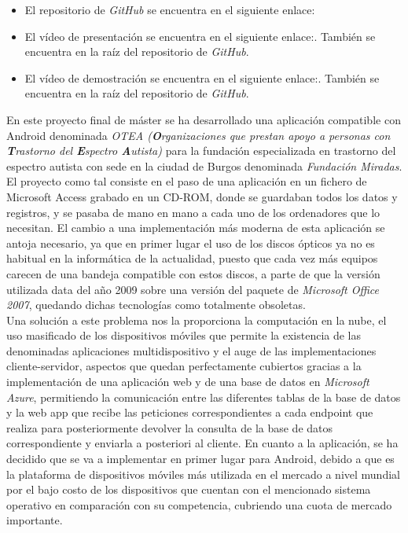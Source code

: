 
\begin{itemize}
    \item El repositorio de \textit{GitHub} se encuentra en el siguiente enlace:\cite{guiaOTEARepo}
    \item El vídeo de presentación se encuentra en el siguiente enlace:\cite{youtubePresentacion}. También se encuentra en la raíz del repositorio de \textit{GitHub}.
    \item El vídeo de demostración se encuentra en el siguiente enlace:\cite{youtubeDemostracion}. También se encuentra en la raíz del repositorio de \textit{GitHub}.
\end{itemize}

En este proyecto final de máster se ha desarrollado una aplicación compatible con
Android denominada \textit{OTEA (\textbf{O}rganizaciones que prestan apoyo a
personas con \textbf{T}rastorno del \textbf{E}spectro \textbf{A}utista)} para la
fundación especializada en trastorno del espectro autista con sede en la ciudad
de Burgos denominada \textit{Fundación Miradas}.\\
El proyecto como tal consiste en el paso de una aplicación en un fichero de
Microsoft Access grabado en un CD-ROM, donde se guardaban todos los datos y
registros, y se pasaba de mano en mano a cada uno de los ordenadores que lo
necesitan.
El cambio a una implementación más moderna de esta aplicación se antoja
necesario, ya que en primer lugar el uso de los discos ópticos ya no es habitual
en la informática de la actualidad, puesto que cada vez más equipos carecen de
una bandeja compatible con estos discos, a parte de que la versión utilizada
data del año 2009 sobre una versión del paquete de \textit{Microsoft Office
2007}, quedando dichas tecnologías como totalmente obsoletas. \\
Una solución a este problema nos la proporciona la computación en la nube, el
uso masificado de los dispositivos móviles que permite la existencia de las
denominadas aplicaciones multidispositivo y el auge de las implementaciones
cliente-servidor, aspectos que quedan perfectamente cubiertos gracias a la
implementación de una aplicación web y de una base de datos en \textit{Microsoft
Azure}, permitiendo la comunicación entre las diferentes tablas de la base de
datos y la web app que recibe las peticiones correspondientes a cada endpoint
que realiza para posteriormente devolver la consulta de la base de datos
correspondiente y enviarla a posteriori al cliente. En cuanto a la aplicación,
se ha decidido que se va a implementar en primer lugar para Android, debido a
que es la plataforma de dispositivos móviles más utilizada en el mercado a nivel
mundial por el bajo costo de los dispositivos que cuentan con el mencionado
sistema operativo en comparación con su competencia, cubriendo una cuota de
mercado importante.
\\
